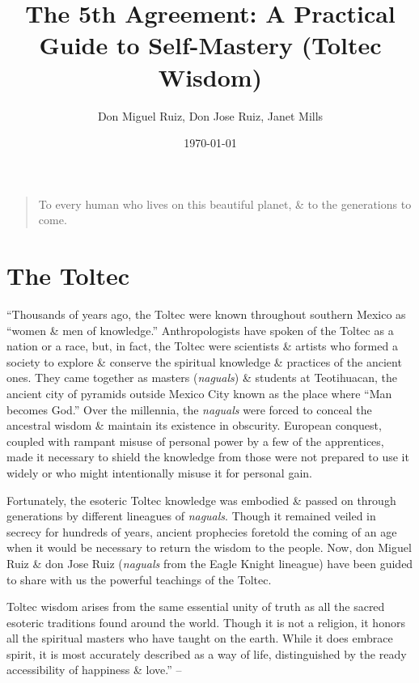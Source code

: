 \documentclass{article}
\title{The 5th Agreement: A Practical Guide to Self-Mastery (Toltec Wisdom)}
\author{Don Miguel Ruiz, Don Jose Ruiz, Janet Mills}
\date{\today}
\numberwithin{equation}{section}
\begin{document}
\maketitle
\tableofcontents
\vspace{5mm}
\begin{quotation}
	To every human who lives on this beautiful planet, \& to the generations to come.
\end{quotation}


\section*{The Toltec}
``Thousands of years ago, the Toltec were known throughout southern Mexico as ``women \& men of knowledge.'' Anthropologists have spoken of the Toltec as a nation or a race, but, in fact, the Toltec were scientists \& artists who formed a society to explore \& conserve the spiritual knowledge \& practices of the ancient ones. They came together as masters (\textit{naguals}) \& students at Teotihuacan, the ancient city of pyramids outside Mexico City known as the place where ``Man becomes God.'' Over the millennia, the \textit{naguals} were forced to conceal the ancestral wisdom \& maintain its existence in obscurity. European conquest, coupled with rampant misuse of personal power by a few of the apprentices, made it necessary to shield the knowledge from those were not prepared to use it widely or who might intentionally misuse it for personal gain.

Fortunately, the esoteric Toltec knowledge was embodied \& passed on through generations by different lineagues of \textit{naguals}. Though it remained veiled in secrecy for hundreds of years, ancient prophecies foretold the coming of an age when it would be necessary to return the wisdom to the people. Now, don Miguel Ruiz \& don Jose Ruiz (\textit{naguals} from the Eagle Knight lineague) have been guided to share with us the powerful teachings of the Toltec.

Toltec wisdom arises from the same essential unity of truth as all the sacred esoteric traditions found around the world. Though it is not a religion, it honors all the spiritual masters who have taught on the earth. While it does embrace spirit, it is most accurately described as a way of life, distinguished by the ready accessibility of happiness \& love.'' -- \cite[p. 12]{Ruiz_Ruiz2011}
\end{document}
